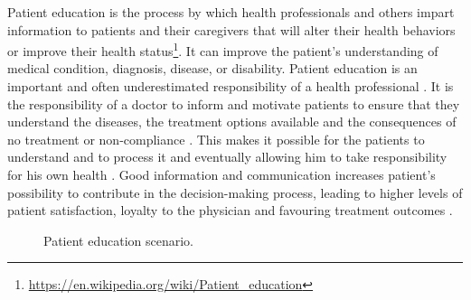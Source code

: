 Patient education is the process by which health professionals and others impart information to patients and their caregivers that will alter their health behaviors or improve their health status\footnote{\url{https://en.wikipedia.org/wiki/Patient_education}}. It can improve the patient's understanding of medical condition, diagnosis, disease, or disability. Patient education is an important and often underestimated responsibility of a health professional \cite{Waitzkin1984}.
It is the responsibility of a doctor to inform and motivate patients to ensure that they understand the diseases, the treatment options available and the consequences of no treatment or non-compliance \cite{Fenol2010}. This makes it possible for the patients to understand and to process it and eventually allowing him to take responsibility for his own health \cite{Ammann2010}. Good information and communication increases patient's possibility to contribute in the decision-making process, leading to higher levels of patient satisfaction, loyalty to the physician and favouring treatment outcomes \cite{Huber2012b,Ammann2010,Cleeren2014}. 
\begin{figure}
	\centering
	\qquad
	\caption{Patient education scenario.}
	\label{fig:2-bg:patientEducation}
\end{figure}
